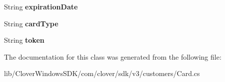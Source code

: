 \begin{DoxyCompactItemize}
\mbox{\label{classcom_1_1clover_1_1sdk_1_1v3_1_1customers_1_1_card_a6f1b9bcfc6c3535fd847473e8950919d}} 
String {\bfseries expiration\+Date}
\item 
\mbox{\label{classcom_1_1clover_1_1sdk_1_1v3_1_1customers_1_1_card_aa15bd95aa3440fcea4c73205b16134f1}} 
String {\bfseries card\+Type}
\item 
\mbox{\label{classcom_1_1clover_1_1sdk_1_1v3_1_1customers_1_1_card_a3647ce62b76a7f61a2b4e92d55f4badc}} 
String {\bfseries token}
\end{DoxyCompactItemize}


The documentation for this class was generated from the following file\+:\begin{DoxyCompactItemize}
\item 
lib/\+Clover\+Windows\+S\+D\+K/com/clover/sdk/v3/customers/Card.\+cs\end{DoxyCompactItemize}
